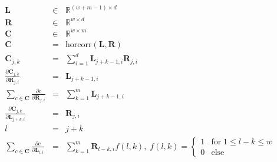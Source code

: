 \documentclass[varwidth=true, border=10pts]{standalone}
\begin{document}
\begin{eqnarray*}
    \mathbf{L} & \in & \mathbb{R}^{(w + m - 1) \times d} \\
    \mathbf{R} & \in & \mathbb{R}^{w \times d} \\
    \mathbf{C} & \in & \mathbb{R}^{w \times m} \\
    \mathbf{C} & = & \text{horcorr}(\mathbf{L}, \mathbf{R}) \\
    \mathbf{C}_{j, k} & = & \sum_{i = 1}^{d} \mathbf{L}_{j + k - 1, i} \mathbf{R}_{j,i} \\
    \frac{\partial \mathbf{C}_{j, k}}{\partial \mathbf{R}_{j,i}} & = & \mathbf{L}_{j + k - 1, i} \\
    \sum_{c \in \mathbf{C}} \frac{\partial c}{\partial \mathbf{R}_{j,i}} & = & \sum_{k = 1}^{m} \mathbf{L}_{j + k - 1, i} \\
    \frac{\partial \mathbf{C}_{j, k}}{\partial \mathbf{L}_{j + k, i}} & = & \mathbf{R}_{j,i} \\
    l & = & j + k \\
    \sum_{c \in \mathbf{C}} \frac{\partial c}{\partial \mathbf{L}_{l, i}} & = & \sum_{k = 1}^{m}
        \mathbf{R}_{l - k,i} f(l, k), \; f(l, k) = \begin{cases} 1 & \text{for} \; 1 \leq l - k \leq w\\
        0 & \text{else}
    \end{cases}
\end{eqnarray*}
\end{document}
